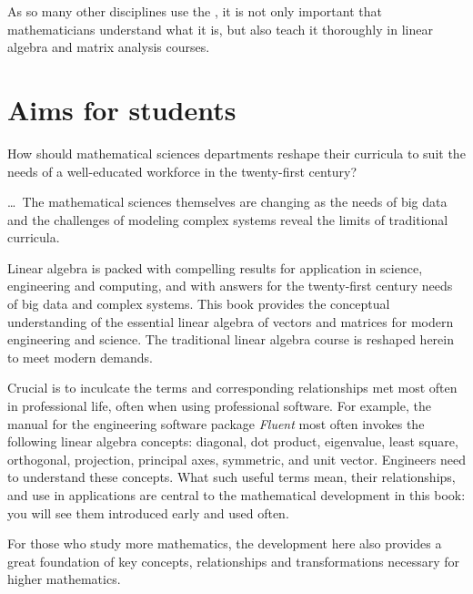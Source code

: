 \begin{quoted}{\cite{Turner2014}}%
As so many other disciplines use the \svd, it is not only important that mathematicians understand what it is, but also teach it thoroughly in linear algebra and matrix analysis courses.
\end{quoted}











\section*{Aims for students}

\begin{quoted}{\cite{Bressoud2014}}
How should mathematical sciences departments reshape their curricula to suit the needs of a well-educated workforce in the twenty-first century?

\ldots\
The mathematical sciences themselves are changing as the needs of big data and the challenges of modeling complex systems reveal the limits of traditional curricula.
%
\end{quoted}



Linear algebra is packed with compelling results for application in science, engineering and computing, and with answers for the twenty-first century needs of big data and complex systems.
This book provides the conceptual understanding of the essential linear algebra of vectors and matrices for modern engineering and science.
The traditional linear algebra course is reshaped herein to meet modern demands.

Crucial is to inculcate the terms and corresponding relationships met most often in professional life, often when using professional software.  
For example, the manual for the engineering software package \emph{Fluent} most often invokes the following linear algebra concepts: diagonal, dot product, eigenvalue, least square, orthogonal, projection, principal axes, symmetric, and unit vector.
Engineers need to understand these concepts.
What such useful terms mean, their relationships, and use in applications are central to the mathematical development in this book: you will see them introduced early and used often.

For those who study more mathematics, the development here also provides a great foundation of key concepts, relationships and transformations necessary for higher mathematics. 

